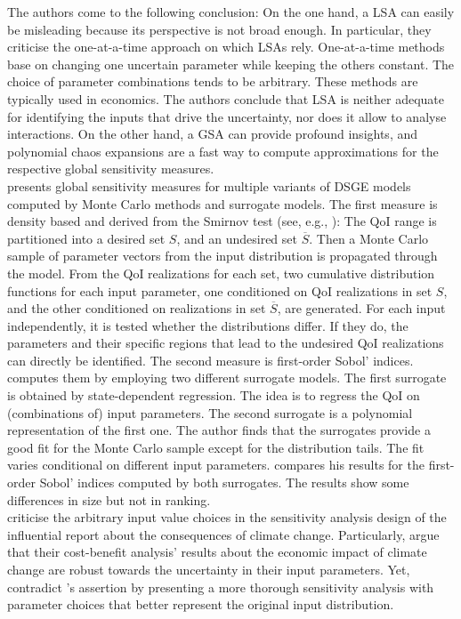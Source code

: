 The authors come to the following conclusion: On the one hand, a LSA can easily be misleading because its perspective is not broad enough. In particular, they criticise the one-at-a-time approach on which LSAs rely. One-at-a-time methods base on changing one uncertain parameter while keeping the others constant. The choice of parameter combinations tends to be arbitrary. These methods are typically used in economics. The authors conclude that LSA is neither adequate for identifying the inputs that drive the uncertainty, nor does it allow to analyse interactions. On the other hand, a GSA can provide profound insights, and polynomial chaos expansions are a fast way to compute approximations for the respective global sensitivity measures.\\
\newline
\cite{Ratto.2008} presents global sensitivity measures for multiple variants of DSGE models computed by Monte Carlo methods and surrogate models. The first measure is density based and derived from the Smirnov test (see, e.g., \cite{Hornberger.1981}): The QoI range is partitioned into a desired set $S$, and an undesired set $\overline{S}$. Then a Monte Carlo sample of parameter vectors from the input distribution is propagated through the model. From the QoI realizations for each set, two cumulative distribution functions for each input parameter, one conditioned on QoI realizations in set $S$, and the other conditioned on realizations in set $\overline{S}$, are generated. For each input independently, it is tested whether the distributions differ. If they do, the parameters and their specific regions that lead to the undesired QoI realizations can directly be identified. The second measure is first-order Sobol' indices. \citeauthor{Ratto.2008} computes them by employing two different surrogate models. The first surrogate is obtained by state-dependent regression. The idea is to regress the QoI on (combinations of) input parameters. The second surrogate is a polynomial representation of the first one. The author finds that the surrogates provide a good fit for the Monte Carlo sample except for the distribution tails. The fit varies conditional on different input parameters. \citeauthor{Ratto.2008} compares his results for the first-order Sobol' indices computed by both surrogates. The results show some differences in size but not in ranking.\\
\newline
\cite{Saltelli.2010} criticise the arbitrary input value choices in the sensitivity analysis design of the influential \cite{Stern.2007} report about the consequences of climate change. Particularly, \citeauthor{Stern.2007} argue that their cost-benefit analysis' results about the economic impact of climate change are robust towards the uncertainty in their input parameters. Yet, \cite{Saltelli.2010} contradict \citeauthor{Stern.2007}'s assertion by presenting a more thorough sensitivity analysis with parameter choices that better represent the original input distribution.\\
